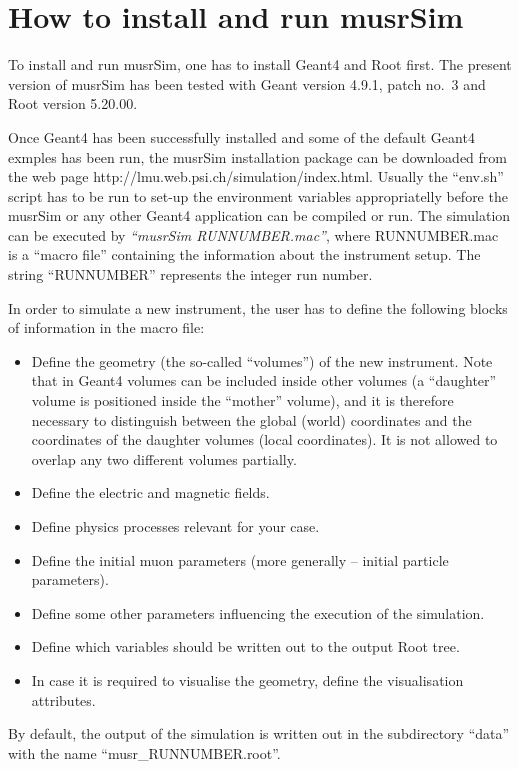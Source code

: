 \documentclass[twoside]{dis04}
\begin{document}
\section{How to install and run musrSim}
To install and run musrSim, one has to install Geant4 and Root first.
The present version of musrSim has been tested with Geant version 4.9.1, patch no.~3
and Root version 5.20.00.

Once Geant4 has been successfully installed and some of the default Geant4 exmples
has been run, the musrSim installation package can be downloaded from the web page 
http://lmu.web.psi.ch/simulation/index.html.
Usually the ``env.sh'' script has to be run to set-up the environment variables
appropriatelly before the musrSim or any other Geant4 application can be compiled
or run.
The simulation can be executed by \emph{``musrSim RUNNUMBER.mac''}, where RUNNUMBER.mac is a ``macro file''
containing the information about the instrument setup.  The string ``RUNNUMBER'' represents the integer run number.

In order to simulate a new instrument, the user has to define the following blocks of information
in the macro file:
%
\begin{itemize}
	\item Define the geometry (the so-called ``volumes'') of the new instrument.
	Note that in Geant4 volumes can be included inside other volumes 
	(a ``daughter'' volume is positioned inside the ``mother'' volume),
	and it is therefore necessary to distinguish between the global (world)
	coordinates and the coordinates of the daughter volumes (local coordinates).
	It is not allowed to overlap any two different volumes partially.
	\item Define the electric and magnetic fields.
	\item Define physics processes relevant for your case.
	\item Define the initial muon parameters (more generally -- initial particle parameters).
	\item Define some other parameters influencing the execution of the simulation.
	\item Define which variables should be written out to the output Root tree.
	\item In case it is required to visualise the geometry, define the visualisation attributes.
\end{itemize}

By default, the output of the simulation is written out in the subdirectory ``data'' with
the name ``musr\_RUNNUMBER.root''.
\end{document}
